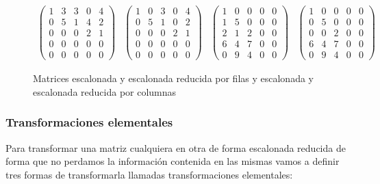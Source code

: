\begin{figure}[h!]
\[
	\begin{array}{cccc}
		\begin{pmatrix}
			1 & 3 & 3 & 0 & 4 \\
			0 & 5 & 1 & 4 & 2 \\
			0 & 0 & 0 & 2 & 1 \\
			0 & 0 & 0 & 0 & 0 \\
			0 & 0 & 0 & 0 & 0
		\end{pmatrix}

		&

		\begin{pmatrix}
			1 & 0 & 3 & 0 & 4 \\
			0 & 5 & 1 & 0 & 2 \\
			0 & 0 & 0 & 2 & 1 \\
			0 & 0 & 0 & 0 & 0 \\
			0 & 0 & 0 & 0 & 0
		\end{pmatrix}

		&

		\begin{pmatrix}
			1 & 0 & 0 & 0 & 0 \\
			1 & 5 & 0 & 0 & 0 \\
			2 & 1 & 2 & 0 & 0 \\
			6 & 4 & 7 & 0 & 0 \\
			0 & 9 & 4 & 0 & 0
		\end{pmatrix}

		&

		\begin{pmatrix}
			1 & 0 & 0 & 0 & 0 \\
			0 & 5 & 0 & 0 & 0 \\
			0 & 0 & 2 & 0 & 0 \\
			6 & 4 & 7 & 0 & 0 \\
			0 & 9 & 4 & 0 & 0
		\end{pmatrix}
	\end{array}
\]
\caption{Matrices escalonada y escalonada reducida por filas y escalonada y escalonada reducida por columnas}
\end{figure}

\subsubsection{Transformaciones elementales}

Para transformar una matriz cualquiera en otra de forma escalonada reducida de forma que no perdamos la información contenida en las mismas vamos a definir tres formas de transformarla llamadas transformaciones elementales:

